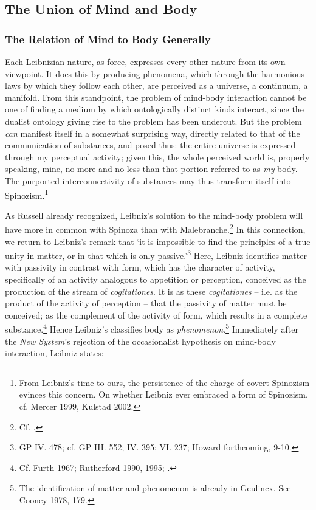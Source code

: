 \documentclass{article}
\begin{document}
\subsection{The Union of Mind and
Body}

\subsubsection{The Relation of Mind to Body
Generally}
Each Leibnizian nature, as force, expresses every other nature from its
own viewpoint. It does this by producing phenomena, which through the
harmonious laws by which they follow each other, are perceived as a
universe, a continuum, a manifold. From this standpoint, the problem of
mind-body interaction cannot be one of finding a medium by which
ontologically distinct kinds interact, since the dualist ontology giving
rise to the problem has been undercut. But the problem \emph{can}
manifest itself in a somewhat surprising way, directly related to that
of the communication of substances, and posed thus: the entire universe
is expressed through my perceptual activity; given this, the whole
perceived world is, properly speaking, mine, no more and no less than
that portion referred to as \emph{my} body. The purported
interconnectivity of substances may thus transform itself into
Spinozism.\footnote{From Leibniz's time to ours, the persistence of the
  charge of covert Spinozism evinces this concern. On whether Leibniz
  ever embraced a form of Spinozism, cf. Mercer 1999, Kulstad 2002.}

As Russell already recognized, Leibniz's solution to the mind-body
problem will have more in common with Spinoza than with
Malebranche.\footnote{Cf. \autocite[139]{Russell1951}.} In this connection, we
return to Leibniz's remark that `it is impossible to find the principles
of a true unity in matter, or in that which is only passive.'\footnote{GP
  IV. 478; cf. GP III. 552; IV. 395; VI. 237; Howard forthcoming, 9-10.}
Here, Leibniz identifies matter with passivity in contrast with form,
which has the character of activity, specifically of an activity
analogous to appetition or perception, conceived as the production of
the stream of \emph{cogitationes}. It is as these \emph{cogitationes} --
i.e. as the product of the activity of perception -- that the passivity
of matter must be conceived; as the complement of the activity of form,
which results in a complete substance.\footnote{Cf. Furth 1967;
  Rutherford 1990, 1995; \autocite{Adams1994}.} Hence Leibniz's classifies body as
\emph{phenomenon}.\footnote{The identification of matter and phenomenon
  is already in Geulincx. See Cooney 1978, 179.} Immediately after the
\emph{New System}'s rejection of the occasionalist hypothesis on
mind-body interaction, Leibniz states:
\end{document}
